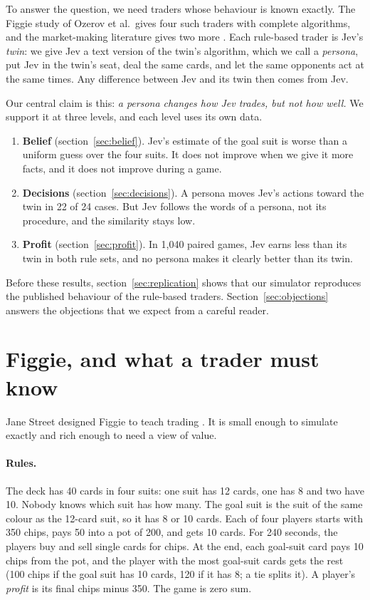 \documentclass[10pt]{article}
\begin{document}
To answer the question, we need traders whose behaviour is known exactly. The Figgie study of Ozerov et al.\ gives four
such traders with complete algorithms, and the market-making literature gives two more \cite{gm,as}. Each rule-based
trader is Jev's \emph{twin}: we give Jev a text version of the twin's algorithm, which we call a \emph{persona}, put Jev
in the twin's seat, deal the
same cards, and let the same opponents act at the same times. Any difference between Jev and its twin then comes from
Jev.

Our central claim is this: \emph{a persona changes how Jev trades, but not how well.} We support it at three levels,
and each level uses its own data.
\begin{enumerate}
\item \textbf{Belief} (section~\ref{sec:belief}). Jev's estimate of the goal suit is worse than a uniform guess over
the four suits. It does not improve when we give it more facts, and it does not improve during a game.
\item \textbf{Decisions} (section~\ref{sec:decisions}). A persona moves Jev's actions toward the twin in 22 of 24
cases. But Jev follows the words of a persona, not its procedure, and the similarity stays low.
\item \textbf{Profit} (section~\ref{sec:profit}). In 1,040 paired games, Jev earns less than its twin in both rule
sets, and no persona makes it clearly better than its twin.
\end{enumerate}
Before these results, section~\ref{sec:replication} shows that our simulator reproduces the published behaviour of the
rule-based traders. Section~\ref{sec:objections} answers the objections that we expect from a careful reader.

\section{Figgie, and what a trader must know}\label{sec:figgie}

Jane Street designed Figgie to teach trading \cite{figgie}. It is small enough to simulate exactly and rich enough to
need a view of value.

\paragraph{Rules.} The deck has 40 cards in four suits: one suit has 12 cards, one has 8 and two have 10. Nobody knows
which suit has how many. The goal suit is the suit of the same colour as the 12-card suit, so it has 8 or 10 cards.
Each of four players starts with 350 chips, pays 50 into a pot of 200, and gets 10 cards. For 240 seconds, the players
buy and sell single cards for chips. At the end, each goal-suit card pays 10 chips from the pot, and the player with the
most goal-suit cards gets the rest (100 chips if the goal suit has 10 cards, 120 if it has 8; a tie splits it). A
player's \emph{profit} is its final chips minus 350. The game is zero sum.
\end{document}
